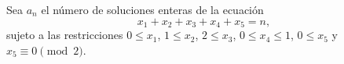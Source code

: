 Sea $a_n$ el número de soluciones enteras de la ecuación
\[x_1+x_2+x_3+x_4+x_5=n,\]
sujeto a las restricciones $0\le x_1$, $1\le x_2$, $2\le x_3$, $0\le x_4\le1$, $0\le x_5$ y $x_5\equiv0\pmod2$.
